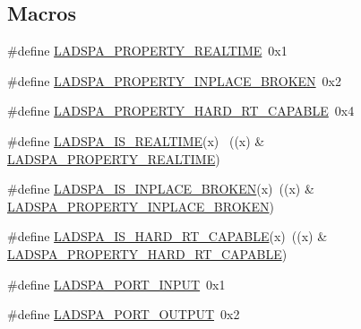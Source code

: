 \subsection*{Macros}
\begin{DoxyCompactItemize}
\item 
\#define \hyperlink{win_2_l_a_d_s_p_a__plugins-win_2ladspa_8h_a44dd66f6f8f6f609b0db4c3df50cff9b}{L\+A\+D\+S\+P\+A\+\_\+\+P\+R\+O\+P\+E\+R\+T\+Y\+\_\+\+R\+E\+A\+L\+T\+I\+ME}~0x1
\item 
\#define \hyperlink{win_2_l_a_d_s_p_a__plugins-win_2ladspa_8h_a91df2f4f6a5da17c33bb3b3ced51018c}{L\+A\+D\+S\+P\+A\+\_\+\+P\+R\+O\+P\+E\+R\+T\+Y\+\_\+\+I\+N\+P\+L\+A\+C\+E\+\_\+\+B\+R\+O\+K\+EN}~0x2
\item 
\#define \hyperlink{win_2_l_a_d_s_p_a__plugins-win_2ladspa_8h_ac07d1935282f77dcd4cd2f519623f543}{L\+A\+D\+S\+P\+A\+\_\+\+P\+R\+O\+P\+E\+R\+T\+Y\+\_\+\+H\+A\+R\+D\+\_\+\+R\+T\+\_\+\+C\+A\+P\+A\+B\+LE}~0x4
\item 
\#define \hyperlink{win_2_l_a_d_s_p_a__plugins-win_2ladspa_8h_a85a070f0d27584f914f1cabe7a74f184}{L\+A\+D\+S\+P\+A\+\_\+\+I\+S\+\_\+\+R\+E\+A\+L\+T\+I\+ME}(x)            ~((x) \& \hyperlink{win_2_l_a_d_s_p_a__plugins-win_2ladspa_8h_a44dd66f6f8f6f609b0db4c3df50cff9b}{L\+A\+D\+S\+P\+A\+\_\+\+P\+R\+O\+P\+E\+R\+T\+Y\+\_\+\+R\+E\+A\+L\+T\+I\+ME})
\item 
\#define \hyperlink{win_2_l_a_d_s_p_a__plugins-win_2ladspa_8h_a5da605ea1bf5a73ebc23b5e73a4eec2a}{L\+A\+D\+S\+P\+A\+\_\+\+I\+S\+\_\+\+I\+N\+P\+L\+A\+C\+E\+\_\+\+B\+R\+O\+K\+EN}(x)~((x) \& \hyperlink{win_2_l_a_d_s_p_a__plugins-win_2ladspa_8h_a91df2f4f6a5da17c33bb3b3ced51018c}{L\+A\+D\+S\+P\+A\+\_\+\+P\+R\+O\+P\+E\+R\+T\+Y\+\_\+\+I\+N\+P\+L\+A\+C\+E\+\_\+\+B\+R\+O\+K\+EN})
\item 
\#define \hyperlink{win_2_l_a_d_s_p_a__plugins-win_2ladspa_8h_a3c1851f15e5f27b5b11137852fa6d1c5}{L\+A\+D\+S\+P\+A\+\_\+\+I\+S\+\_\+\+H\+A\+R\+D\+\_\+\+R\+T\+\_\+\+C\+A\+P\+A\+B\+LE}(x)~((x) \& \hyperlink{win_2_l_a_d_s_p_a__plugins-win_2ladspa_8h_ac07d1935282f77dcd4cd2f519623f543}{L\+A\+D\+S\+P\+A\+\_\+\+P\+R\+O\+P\+E\+R\+T\+Y\+\_\+\+H\+A\+R\+D\+\_\+\+R\+T\+\_\+\+C\+A\+P\+A\+B\+LE})
\item 
\#define \hyperlink{win_2_l_a_d_s_p_a__plugins-win_2ladspa_8h_a250d3bdf77d0de6abfe7def8b69dd5bb}{L\+A\+D\+S\+P\+A\+\_\+\+P\+O\+R\+T\+\_\+\+I\+N\+P\+UT}~0x1
\item 
\#define \hyperlink{win_2_l_a_d_s_p_a__plugins-win_2ladspa_8h_a34b94dfb4391fe95181e9f367fa5b3e1}{L\+A\+D\+S\+P\+A\+\_\+\+P\+O\+R\+T\+\_\+\+O\+U\+T\+P\+UT}~0x2

\end{DoxyCompactItemize}
